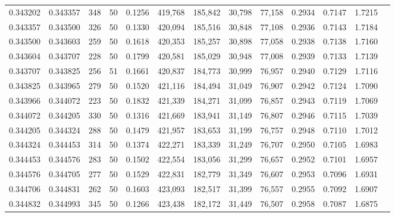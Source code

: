 \begin{tabular}{rrrrrrrrrrrrr}
0.343202 & 0.343357 &   348 &  50 &                                     0.1256 & 419,768 & 185,842 &  30,798 &  77,158 & 0.2934 & 0.7147 & 1.7215 \\
0.343357 & 0.343500 &   326 &  50 &                                     0.1330 & 420,094 & 185,516 &  30,848 &  77,108 & 0.2936 & 0.7143 & 1.7184 \\
0.343500 & 0.343603 &   259 &  50 &                                     0.1618 & 420,353 & 185,257 &  30,898 &  77,058 & 0.2938 & 0.7138 & 1.7160 \\
0.343604 & 0.343707 &   228 &  50 &                                     0.1799 & 420,581 & 185,029 &  30,948 &  77,008 & 0.2939 & 0.7133 & 1.7139 \\
0.343707 & 0.343825 &   256 &  51 &                                     0.1661 & 420,837 & 184,773 &  30,999 &  76,957 & 0.2940 & 0.7129 & 1.7116 \\
0.343825 & 0.343965 &   279 &  50 &                                     0.1520 & 421,116 & 184,494 &  31,049 &  76,907 & 0.2942 & 0.7124 & 1.7090 \\
0.343966 & 0.344072 &   223 &  50 &                                     0.1832 & 421,339 & 184,271 &  31,099 &  76,857 & 0.2943 & 0.7119 & 1.7069 \\
0.344072 & 0.344205 &   330 &  50 &                                     0.1316 & 421,669 & 183,941 &  31,149 &  76,807 & 0.2946 & 0.7115 & 1.7039 \\
0.344205 & 0.344324 &   288 &  50 &                                     0.1479 & 421,957 & 183,653 &  31,199 &  76,757 & 0.2948 & 0.7110 & 1.7012 \\
0.344324 & 0.344453 &   314 &  50 &                                     0.1374 & 422,271 & 183,339 &  31,249 &  76,707 & 0.2950 & 0.7105 & 1.6983 \\
0.344453 & 0.344576 &   283 &  50 &                                     0.1502 & 422,554 & 183,056 &  31,299 &  76,657 & 0.2952 & 0.7101 & 1.6957 \\
0.344576 & 0.344705 &   277 &  50 &                                     0.1529 & 422,831 & 182,779 &  31,349 &  76,607 & 0.2953 & 0.7096 & 1.6931 \\
0.344706 & 0.344831 &   262 &  50 &                                     0.1603 & 423,093 & 182,517 &  31,399 &  76,557 & 0.2955 & 0.7092 & 1.6907 \\
0.344832 & 0.344993 &   345 &  50 &                                     0.1266 & 423,438 & 182,172 &  31,449 &  76,507 & 0.2958 & 0.7087 & 1.6875 \\

\end{tabular}
